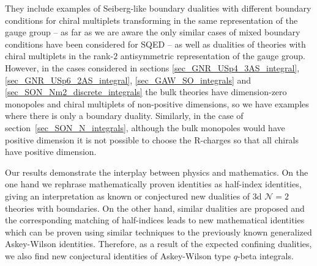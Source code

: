 \documentclass[12pt]{article}
\numberwithin{equation}{section}
\begin{document}
They include examples of Seiberg-like boundary dualities with different boundary conditions for chiral multiplets transforming in the same representation of the gauge group -- as far as we are aware the only similar cases of mixed boundary conditions have been considered for SQED \cite{Dimofte:2017tpi} -- 
as well as dualities of theories with chiral multiplets in the rank-$2$ antisymmetric representation of the gauge group. 
However, in the cases considered in sections \ref{sec_GNR_USp4_3AS_integral}, \ref{sec_GNR_USp6_2AS_integral}, \ref{sec_GAW_SO_integrals} and \ref{sec_SON_Nm2_discrete_integrals} the bulk theories have dimension-zero monopoles and chiral multiplets of non-positive dimensions, so we have examples where there is only a boundary duality. Similarly, in the case of section~\ref{sec_SON_N_integrals}, although the bulk monopoles would have positive dimension it is not possible to choose the R-charges so that all chirals have positive dimension.

Our results demonstrate the interplay between physics and mathematics. On the one hand we rephrase mathematically proven identities as half-index identities, giving an interpretation as known or conjectured new dualities of 3d $\mathcal{N}=2$ theories with boundaries. On the other hand, similar dualities are proposed and the corresponding matching of half-indices leads to new mathematical identities which can be proven using similar techniques to the previously known generalized Askey-Wilson identities. Therefore, as 
a result of the expected confining dualities, we also find new conjectural identities of Askey-Wilson type $q$-beta integrals. 


\end{document}
